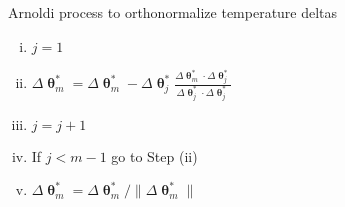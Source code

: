 \begin{framedbox}[htbp]
  \caption{Arnoldi process to orthonormalize temperature deltas}
  \label{box:arnoldi_process}
  \begin{center}
    \begin{minipage}{0.9\textwidth}
    \begin{enumerate}[(i)]
      \item \(j=1\)
      \item \(\Delta \bm\uptheta^*_m = \Delta \bm\uptheta^*_m - \Delta \bm\uptheta^*_j\frac{\Delta\bm\uptheta^*_m\cdot\Delta\bm\uptheta^*_j}{\Delta\bm \uptheta^*_j\cdot\Delta\bm\uptheta^*_j}\)
      \item \(j=j+1\)
      \item If \(j<m-1\) go to Step (ii)
      \item \(\Delta\bm \uptheta^*_m = \Delta\bm\uptheta^*_m/\|\Delta \bm \uptheta^*_m\|\)
    \end{enumerate}
    \end{minipage}
  \end{center}
\end{framedbox}

